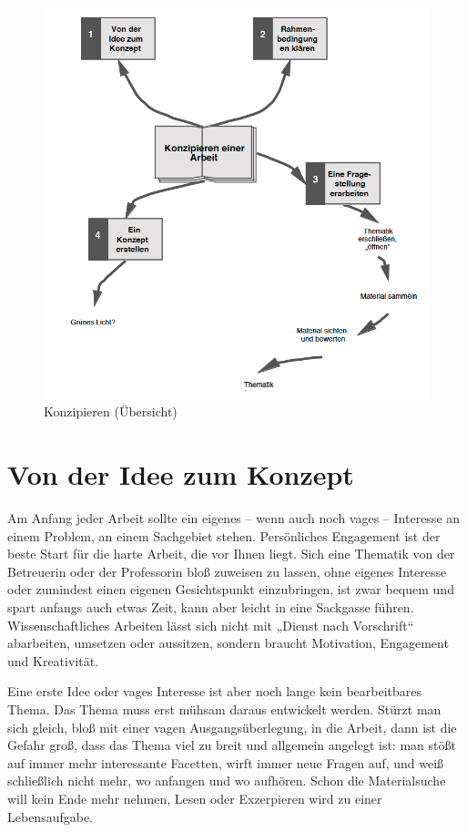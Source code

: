 \documentclass[]{book}
\theoremstyle{definition}
\theoremstyle{definition}
\theoremstyle{definition}
\theoremstyle{remark}
\begin{document}
\begin{figure}

{\centering \includegraphics{images/konzipieren-min} 

}

\caption{Konzipieren (Übersicht)}\label{fig:unnamed-chunk-1}
\end{figure}

\section{Von der Idee zum Konzept}\label{von-der-idee-zum-konzept}

Am Anfang jeder Arbeit sollte ein eigenes -- wenn auch noch vages --
Interesse an einem Problem, an einem Sachgebiet stehen. Persönliches
Engagement ist der beste Start für die harte Arbeit, die vor Ihnen
liegt. Sich eine Thematik von der Betreuerin oder der Professorin bloß
zuweisen zu lassen, ohne eigenes Interesse oder zumindest einen eigenen
Gesichtspunkt einzubringen, ist zwar bequem und spart anfangs auch etwas
Zeit, kann aber leicht in eine Sackgasse führen. Wissenschaftliches
Arbeiten lässt sich nicht mit „Dienst nach Vorschrift`` abarbeiten,
umsetzen oder aussitzen, sondern braucht Motivation, Engagement und
Kreativität.

Eine erste Idee oder vages Interesse ist aber noch lange kein
bearbeitbares Thema. Das Thema muss erst mühsam daraus entwickelt
werden. Stürzt man sich gleich, bloß mit einer vagen Ausgangsüberlegung,
in die Arbeit, dann ist die Gefahr groß, dass das Thema viel zu breit
und allgemein angelegt ist: man stößt auf immer mehr interessante
Facetten, wirft immer neue Fragen auf, und weiß schließlich nicht mehr,
wo anfangen und wo aufhören. Schon die Materialsuche will kein Ende mehr
nehmen, Lesen oder Exzerpieren wird zu einer Lebensaufgabe.
\end{document}
